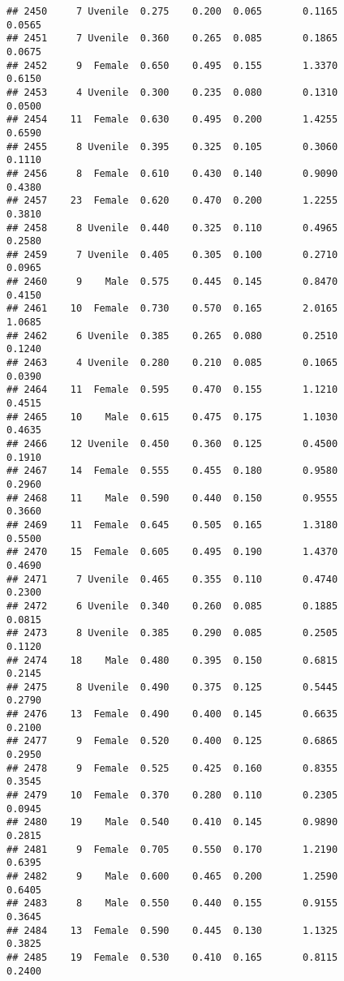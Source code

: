\documentclass[
]{article}
\begin{document}
\begin{verbatim}
## 2450     7 Uvenile  0.275    0.200  0.065       0.1165         0.0565
## 2451     7 Uvenile  0.360    0.265  0.085       0.1865         0.0675
## 2452     9  Female  0.650    0.495  0.155       1.3370         0.6150
## 2453     4 Uvenile  0.300    0.235  0.080       0.1310         0.0500
## 2454    11  Female  0.630    0.495  0.200       1.4255         0.6590
## 2455     8 Uvenile  0.395    0.325  0.105       0.3060         0.1110
## 2456     8  Female  0.610    0.430  0.140       0.9090         0.4380
## 2457    23  Female  0.620    0.470  0.200       1.2255         0.3810
## 2458     8 Uvenile  0.440    0.325  0.110       0.4965         0.2580
## 2459     7 Uvenile  0.405    0.305  0.100       0.2710         0.0965
## 2460     9    Male  0.575    0.445  0.145       0.8470         0.4150
## 2461    10  Female  0.730    0.570  0.165       2.0165         1.0685
## 2462     6 Uvenile  0.385    0.265  0.080       0.2510         0.1240
## 2463     4 Uvenile  0.280    0.210  0.085       0.1065         0.0390
## 2464    11  Female  0.595    0.470  0.155       1.1210         0.4515
## 2465    10    Male  0.615    0.475  0.175       1.1030         0.4635
## 2466    12 Uvenile  0.450    0.360  0.125       0.4500         0.1910
## 2467    14  Female  0.555    0.455  0.180       0.9580         0.2960
## 2468    11    Male  0.590    0.440  0.150       0.9555         0.3660
## 2469    11  Female  0.645    0.505  0.165       1.3180         0.5500
## 2470    15  Female  0.605    0.495  0.190       1.4370         0.4690
## 2471     7 Uvenile  0.465    0.355  0.110       0.4740         0.2300
## 2472     6 Uvenile  0.340    0.260  0.085       0.1885         0.0815
## 2473     8 Uvenile  0.385    0.290  0.085       0.2505         0.1120
## 2474    18    Male  0.480    0.395  0.150       0.6815         0.2145
## 2475     8 Uvenile  0.490    0.375  0.125       0.5445         0.2790
## 2476    13  Female  0.490    0.400  0.145       0.6635         0.2100
## 2477     9  Female  0.520    0.400  0.125       0.6865         0.2950
## 2478     9  Female  0.525    0.425  0.160       0.8355         0.3545
## 2479    10  Female  0.370    0.280  0.110       0.2305         0.0945
## 2480    19    Male  0.540    0.410  0.145       0.9890         0.2815
## 2481     9  Female  0.705    0.550  0.170       1.2190         0.6395
## 2482     9    Male  0.600    0.465  0.200       1.2590         0.6405
## 2483     8    Male  0.550    0.440  0.155       0.9155         0.3645
## 2484    13  Female  0.590    0.445  0.130       1.1325         0.3825
## 2485    19  Female  0.530    0.410  0.165       0.8115         0.2400

\end{verbatim}
\end{document}
